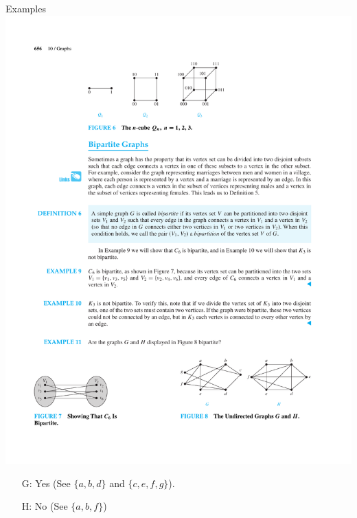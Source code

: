 \documentclass{beamer}
\theoremstyle{definition}
\begin{document}
\begin{frame}{Examples}
    \centering \includegraphics[trim={10cm 3.2cm 2cm 21cm}, clip, width=.9\linewidth]{p656}
    \begin{itemize}
        \item[G:] Yes (See $\{a,b,d\}$ and $\{c, e, f, g\}$).
        \item[H:] No (See $\{a,b,f\}$)
    \end{itemize}
\end{frame}
\end{document}
